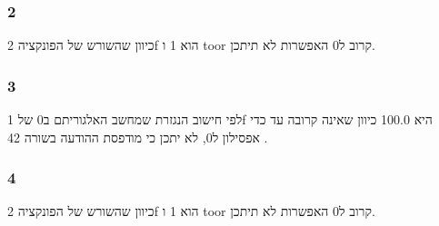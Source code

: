 \documentclass[a4paper]{article}
\begin{document}
\subsubsection*{2}
כיוון שהשורש של הפונקציה
2f
הוא 1 ו
toor
קרוב ל0 האפשרות לא תיתכן.
\subsubsection*{3}
לפי חישוב הנגזרת שמחשב האלגוריתם ב0 של 
1f
היא
100.0
כיוון שאינה קרובה עד כדי אפסילון ל0, לא יתכן כי מודפסת ההודעה בשורה 
42
.
\subsubsection*{4}
כיוון שהשורש של הפונקציה
2f
הוא 1 ו
toor
קרוב ל0 האפשרות לא תיתכן.
\end{document}

